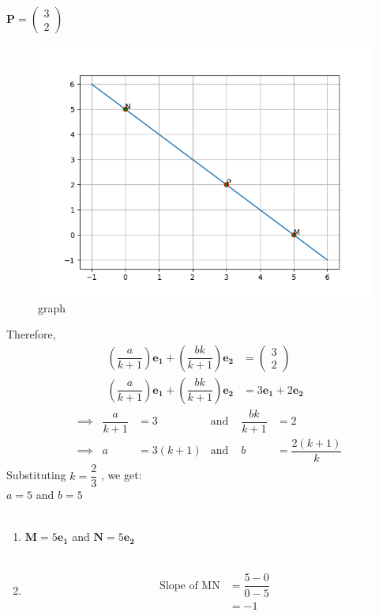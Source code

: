 \documentclass[journal,12pt,twocolumn]{IEEEtran}
\theoremstyle{remark}
\newcommand{\myvec}[1]{\ensuremath{\begin{pmatrix}#1\end{pmatrix}}}
\numberwithin{equation}{subsection}
\let\vec\mathbf
\begin{document}
 $ \vec{P} = \myvec{3 \\ 2}$\\
\begin{figure}
\centering  
\includegraphics[width=\columnwidth]{figures/Figure_1.png}
\caption{graph}
\label{graph} 
\end{figure}
Therefore,
\begin{align}
 \left( \dfrac{a}{k+1}\right) \vec{e_1}+\left( \dfrac{bk}{k+1}\right) \vec{e_2} &= \myvec{3 \\ 2}\\
 \left( \dfrac{a}{k+1}\right) \vec{e_1}+\left( \dfrac{bk}{k+1}\right) \vec{e_2} &= 3\vec{e_1}+2\vec{e_2}
\end{align}
\begin{align}
  &\implies&\dfrac{a}{k+1} &= 3 &\text{and } &\dfrac{bk}{k+1} &= 2 \\
  &\implies&a &= 3(k+1)  &\text{and } &b &= \dfrac{2(k+1)}{k}
\end{align}   
Substituting $k = \dfrac{2}{3}$ , we get:\\
   $a = 5$ and $b = 5$\\\\
\begin{enumerate}
\item$\vec{M} = 5\vec{e_1}$ and $\vec{N} = 5\vec{e_2}$\\\\
\item \begin{align}
      \text{Slope of MN} &= \dfrac{5-0}{0-5}\\
                  &= -1
      \end{align}
\end{enumerate}                  
\end{document}
